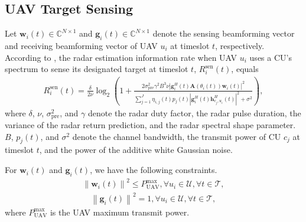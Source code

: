 \documentclass[10pt,journal,compsoc]{IEEEtran}
\begin{document}
\subsection{UAV Target Sensing}
Let $\bm{w}_{i}(t) \in \mathbb{C}^{N \times 1}$ and $\bm{g}_{i}(t) \in \mathbb{C}^{N \times 1}$ denote the sensing beamforming vector and receiving beamforming vector of UAV $u_{i}$ at timeslot $t$, respectively. According to \cite{System model: Radar-estimation-rate, Related works:ISAC:JSAC:Dual-Functional-UAV-Empowered, Related works:ISCC:IoTJ:Unmanned-Aerial-Vehicle}, 
the radar estimation information rate when UAV $u_{i}$ uses a CU's spectrum to sense its designated target at timeslot $t$,  $R_{i}^{\text{sen}}(t)$, equals  
    \begin{equation}\label{radar-estimation-information-rate}
    \begin{array}{l}
    R_{i}^{\text{sen}}(t) = \frac{\delta}{2\nu} %
    \log_2 \left( 1 %
    +  \frac{2\sigma_{\text{pre}}^{2}\gamma^{2}B^{3}\nu \left|\bm{g}^{H}_{i}(t)\mathbf{A}(\theta_{i}(t)) \bm{w}_{i}(t)\right|^{2}}{\sum \limits_{j = 1 }^{J} \eta_{i, j}(t) p_{j}(t) \left|\bm{g}_{i}^{H}(t)\bm{h}_{c_{j}, u_{i}}^{H}(t)\right|^{2} + \sigma^{2}} \right),
    \end{array}
    \end{equation}
where $\delta$, $\nu$, $\sigma^{2}_{\text{pre}}$, and $\gamma$ denote the radar duty factor,  the radar pulse duration,  the variance of the radar return prediction, and  the radar spectral shape parameter.  $B$, $p_{j}(t)$, and $\sigma^{2}$  denote the channel bandwidth, 
the transmit power of CU $c_{j}$ at timeslot $t$, and  the power of the additive white Gaussian noise.

For $\bm{w}_{i}(t)$ and $\bm{g}_{i}(t)$, we have the following constraints.
\begin{align}\label{P0:UAV-Sen-Max-Power}
\left\|\bm{w}_{i}(t)\right\|^{2} \le P^{\max}_{\text{UAV}}, \forall u_{i} \in \mathcal{U}, \forall t \in \mathcal{T},
\end{align}
\begin{align}\label{P0:rec-beamforming}
    \left\| \bm{g}_{i}(t) \right\|^{2} = 1, \forall u_{i} \in \mathcal{U}, \forall t \in \mathcal{T},
\end{align}
where $P^{\max}_{\text{UAV}}$ is the UAV maximum transmit power.
\end{document}
